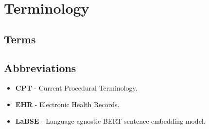 
\chapter*{Terminology}

\section*{Terms}

\begin{itemize}
    \setlength\itemsep{1px}
\end{itemize}

\section*{Abbreviations}

\begin{itemize}
    \setlength\itemsep{1px}
    \item \textbf{CPT} - Current Procedural Terminology.
    \item \textbf{EHR} - Electronic Health Records.
    \item \textbf{LaBSE} - Language-agnostic BERT sentence embedding model.
\end{itemize}



